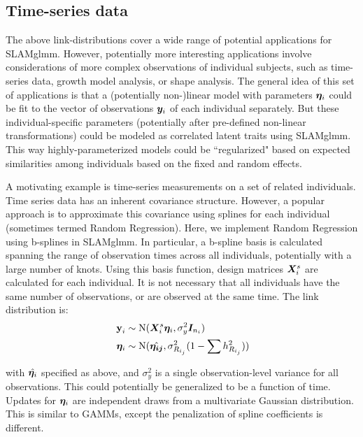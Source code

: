 \documentclass[11pt]{amsart}
\newcommand*{\B}[1]{\ifmmode\bm{#1}\else\textbf{#1}\fi}
\begin{document}
\subsection{Time-series data}
The above link-distributions cover a wide range of potential applications for SLAMglmm. However, potentially more interesting applications involve considerations of more complex observations of individual subjects, such as time-series data, growth model analysis, or shape analysis. The general idea of this set of applications is that a (potentially non-)linear model with parameters $\B{\eta}_i$ could be fit to the vector of observations $\B{y}_i$ of each individual separately. But these individual-specific parameters (potentially after pre-defined non-linear transformations) could be modeled as correlated latent traits using SLAMglmm. This way highly-parameterized models could be ``regularized" based on expected similarities among individuals based on the fixed and random effects.

A motivating example is time-series measurements on a set of related individuals. Time series data has an inherent covariance structure. However, a popular approach is to approximate this covariance using splines for each individual (sometimes termed Random Regression). Here, we implement Random Regression using b-splines in SLAMglmm. In particular, a b-spline basis is calculated spanning the range of observation times across all individuals, potentially with a large number of knots. Using this basis function,
design matrices $\B{X}^s_i$ are calculated for each individual. It is not necessary that all individuals have the same number of observations, or are observed at the same time. The link distribution is:
\begin{align} \begin{split}
\B{y}_i &\sim \mbox{N}(\B{X}^s_i \B{\eta}_i, \sigma^2_y \B{I}_{n_i}) \\
\;\B{\eta}_i &\sim \mbox{N}(\hat{\B{\eta_{ij}}},\sigma^2_{R_{i_j}}(1-\sum h^2_{R_{i_j}}))
\end{split}\end{align}

\noindent with $\hat{\B{\eta}_i}$ specified as above, and $\sigma^2_y$ is a single observation-level variance for all observations. This could potentially be generalized to be a function of time. Updates for $\B{\eta}_i$ are independent draws from a multivariate Gaussian distribution. This is similar to GAMMs, except the penalization of spline coefficients is different.
\end{document}
